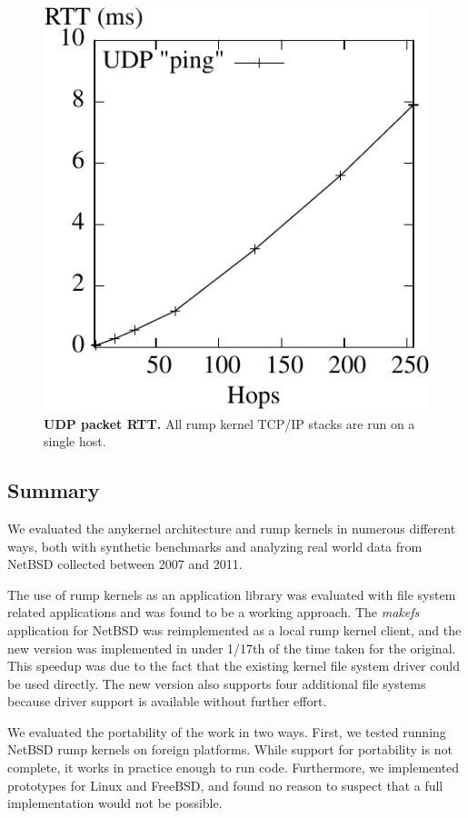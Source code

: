 \begin{figure}[t]
\includegraphics{latency.pdf}
\caption[UDP packet RTT]{
\textbf{UDP packet RTT.}
All rump kernel TCP/IP stacks are run on a single host.
}
\label{fig:cluster}
\end{figure}

\subsection{Summary}

We evaluated the anykernel architecture and rump kernels in numerous
different ways, both with synthetic benchmarks and analyzing real
world data from NetBSD collected between 2007 and 2011.

The use of rump kernels as an application library was evaluated
with file system related applications and was found to be a working
approach.  The \textit{makefs} application for NetBSD was reimplemented
as a local rump kernel client, and the new version was implemented
in under 1/17th of the time taken for the original.  This speedup
was due to the fact that the existing kernel file system driver
could be used directly.  The new version also supports four additional
file systems because driver support is available without further effort.

We evaluated the portability of the work in two ways.  First, we
tested running NetBSD rump kernels on foreign platforms.  While
support for portability is not complete, it works in practice
enough to run code.  Furthermore, we implemented prototypes
for Linux and FreeBSD, and found no reason to
suspect that a full implementation would not be possible.

